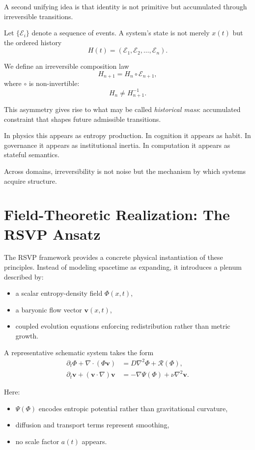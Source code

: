\documentclass[12pt]{article}
\begin{document}
A second unifying idea is that identity is not primitive but accumulated through irreversible transitions.

Let $\{\mathcal{E}_i\}$ denote a sequence of events. A system's state is not merely $x(t)$ but the ordered history
\[
H(t) = (\mathcal{E}_1, \mathcal{E}_2, \dots, \mathcal{E}_n).
\]

We define an irreversible composition law
\[
H_{n+1} = H_n \circ \mathcal{E}_{n+1},
\]
where $\circ$ is non-invertible:
\[
H_n \not= H_{n+1}^{-1}.
\]

This asymmetry gives rise to what may be called \emph{historical mass}: accumulated constraint that shapes future admissible transitions.

In physics this appears as entropy production.
In cognition it appears as habit.
In governance it appears as institutional inertia.
In computation it appears as stateful semantics.

Across domains, irreversibility is not noise but the mechanism by which systems acquire structure.

\section{Field-Theoretic Realization: The RSVP Ansatz}

The RSVP framework provides a concrete physical instantiation of these principles. Instead of modeling spacetime as expanding, it introduces a plenum described by:

\begin{itemize}[leftmargin=2em]
\item a scalar entropy-density field $\Phi(x,t)$,
\item a baryonic flow vector $\bm{v}(x,t)$,
\item coupled evolution equations enforcing redistribution rather than metric growth.
\end{itemize}

A representative schematic system takes the form
\begin{align}
\partial_t \Phi + \nabla \cdot (\Phi \bm{v}) &= D \nabla^2 \Phi + \mathcal{R}(\Phi), \\
\partial_t \bm{v} + (\bm{v}\cdot\nabla)\bm{v} &= -\nabla \Psi(\Phi) + \nu \nabla^2 \bm{v}.
\end{align}

Here:

\begin{itemize}[leftmargin=2em]
\item $\Psi(\Phi)$ encodes entropic potential rather than gravitational curvature,
\item diffusion and transport terms represent smoothing,
\item no scale factor $a(t)$ appears.
\end{itemize}
\end{document}
